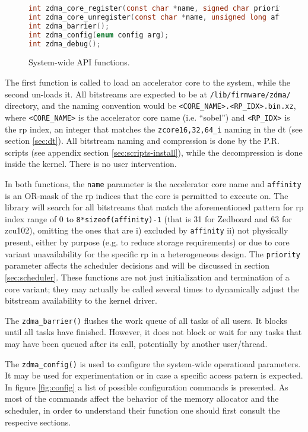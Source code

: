 \begin{figure}[H]
\centering
\begin{lstlisting}[style=basic,language=C]
int zdma_core_register(const char *name, signed char priority, unsigned long affinity);
int zdma_core_unregister(const char *name, unsigned long affinity);
int zdma_barrier();
int zdma_config(enum config arg);
int zdma_debug();
\end{lstlisting}
\caption{System-wide API functions.}
\label{lst:api-system}
\end{figure}

The first function is called to load an accelerator core to the system, while
the second un-loads it.
All bitstreams are expected to be at \texttt{/lib/firmware/zdma/} directory,
and the naming convention would be \texttt{<CORE\_NAME>.<RP\_IDX>.bin.xz},
where \texttt{<CORE\_NAME>} is the accelerator core name (i.e. ``sobel'')
and \texttt{<RP\_IDX>} is the \gls{rp} index, an integer that matches
the \texttt{zcore{16,32,64}\_i} naming in the \gls{dt} (see section \ref{sec:dt}).
All bitstream naming and compression is done by the P.R. scripts (see appendix section \ref{sec:scripts-install}),
while the decompression is done inside the kernel. There is no user intervention.

In both functions, the \texttt{name} parameter is the accelerator core name and 
\texttt{affinity} is an OR-mask of the \gls{rp} indices that the core is permitted to execute on.
The library will search for all bitstreams that match the aforementioned pattern for 
\gls{rp} index range of 0 to \texttt{8*sizeof(affinity)-1} (that is 31 for Zedboard and 63 for zcu102),
omitting the ones that are i) excluded by \texttt{affinity} ii) not physically present,
either by purpose (e.g. to reduce storage requirements) or due to core variant unavailability for
the specific \gls{rp} in a heterogeneous design. The \texttt{priority} parameter affects
the scheduler decisions and will be discussed in section \ref{sec:scheduler}.
These functions are not just initialization and termination of a core variant; they may
actually be called several times to dynamically adjust the bitstream availability to the kernel driver.

The \texttt{zdma\_barrier()} flushes the work queue of all tasks of all users.
It blocks until all tasks have finished. However, it does not block or wait for any
tasks that may have been queued after its call, potentially by another user/thread.

The \texttt{zdma\_config()} is used to configure the system-wide operational parameters.
It may be used for experimentation or in case a specific access patern is expected. 
In figure \ref{fig:config} a list of possible configuration commands is presented.
As most of the commands affect the behavior of the memory allocator and the scheduler,
in order to understand their function
one should first consult the respecive sections.


